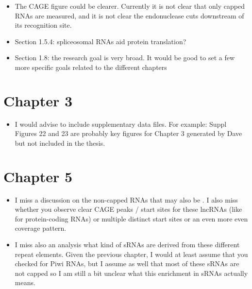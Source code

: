 \documentclass[12pt,a4paper,sans]{article}
\begin{document}
\begin{itemize}
   \item{The CAGE figure could be clearer. Currently it is not clear that only capped RNAs are measured, and it is not clear the endonuclease cuts downstream of its recognition site.}
\end{itemize}

\begin{itemize}
   \item{Section 1.5.4: spliceosomal RNAs aid protein translation?}
\end{itemize}

\begin{itemize}
   \item{Section 1.8: the research goal is very broad. It would be good to set a few more specific goals related to the different chapters}
\end{itemize}

\section{Chapter 3}

\begin{itemize}
   \item{I would advise to include supplementary data files. For example: Suppl Figures 22 and 23 are probably key figures for Chapter 3 generated by Dave but not included in the thesis.}
\end{itemize}

\section{Chapter 5}

\begin{itemize}
   \item{I miss a discussion on the non-capped RNAs that may also be . I also miss whether you observe clear CAGE peaks / start sites for these lncRNAs (like for protein-coding RNAs) or multiple distinct start sites or an even more even coverage pattern.}
\end{itemize}

\begin{itemize}
   \item{I miss also an analysis what kind of sRNAs are derived from these different repeat elements. Given the previous chapter, I would at least assume that you checked for Piwi RNAs, but I assume as well that most of these sRNAs are not capped so I am still a bit unclear what this enrichment in sRNAs actually means.}
\end{itemize}
\end{document}
